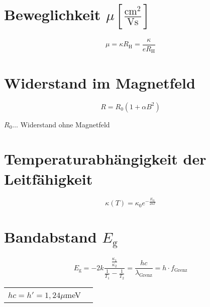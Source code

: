 	\section{Beweglichkeit $\mu\left[\frac{\text{cm}^2}{\text{Vs}}\right]$}
		\[
			\mu=\kappa R_{\text{H}}=\frac{\kappa}{eR_{\text{H}}}
		\]

	\section{Widerstand im Magnetfeld}
		\[
			R=R_0(1+\alpha B^2)
		\]

		$R_0\dots$ Widerstand ohne Magnetfeld

	\section{Temperaturabhängigkeit der Leitfähigkeit}
		\[
			\kappa(T)=\kappa_0e^{-\frac{E_{\text{G}}}{2kT}}
		\]

	\section{Bandabstand $E_{\text{g}}$}
		\[
			E_{\text{g}}=-2k\frac{\frac{\kappa_1}{\kappa_2}}{\frac{1}{T_1}-\frac{1}{T_2}}=\frac{hc}{\lambda_{\mathrm{Grenz}}}=h\cdot f_{\mathrm{Grenz}}
		\]
		\begin{table}[h]
		\begin{tabular}{ll}
		$hc=h'=1,24\mu$meV \\
		\end{tabular}
		\end{table}
